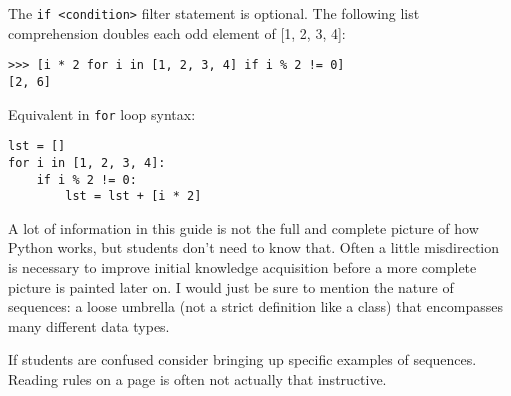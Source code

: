 \begin{blocksection}
The \lstinline{if <condition>} filter statement is optional. The following list comprehension doubles each odd element of [1, 2, 3, 4]:

\begin{lstlisting}
>>> [i * 2 for i in [1, 2, 3, 4] if i % 2 != 0] 
[2, 6]
\end{lstlisting}
\end{blocksection}

\begin{blocksection}
Equivalent in \lstinline{for} loop syntax:

\begin{lstlisting}
lst = []
for i in [1, 2, 3, 4]:
    if i % 2 != 0:
        lst = lst + [i * 2]
\end{lstlisting}
\end{blocksection}

\begin{guide}
A lot of information in this guide is not the full and complete picture of how Python works, but students don't need to know that. Often a little misdirection is necessary to improve initial knowledge acquisition before a more complete picture is painted later on. I would just be sure to mention the nature of sequences: a loose umbrella (not a strict definition like a class) that encompasses many different data types. 

If students are confused consider bringing up specific examples of sequences. Reading rules on a page is often not actually that instructive. 
\end{guide}
